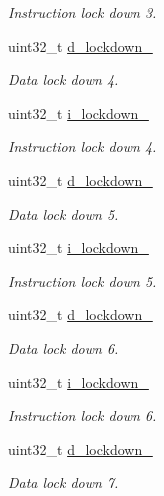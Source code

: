\begin{DoxyCompactItemize}
\begin{DoxyCompactList}\small\item\em Instruction lock down 3. \end{DoxyCompactList}\item 
uint32\+\_\+t \mbox{\hyperlink{group__L2C-310__cache_ga65d17f11698ba1fb6b608c6067e3b822}{d\+\_\+lockdown\+\_}}
\begin{DoxyCompactList}\small\item\em Data lock down 4. \end{DoxyCompactList}\item 
uint32\+\_\+t \mbox{\hyperlink{group__L2C-310__cache_ga4f80c905aa661050921790befc94b792}{i\+\_\+lockdown\+\_}}
\begin{DoxyCompactList}\small\item\em Instruction lock down 4. \end{DoxyCompactList}\item 
uint32\+\_\+t \mbox{\hyperlink{group__L2C-310__cache_gaeeb5f8fca64453b14addb33ec2a616c7}{d\+\_\+lockdown\+\_}}
\begin{DoxyCompactList}\small\item\em Data lock down 5. \end{DoxyCompactList}\item 
uint32\+\_\+t \mbox{\hyperlink{group__L2C-310__cache_gac26d73de3cfb28186d3e380d6c325cdc}{i\+\_\+lockdown\+\_}}
\begin{DoxyCompactList}\small\item\em Instruction lock down 5. \end{DoxyCompactList}\item 
uint32\+\_\+t \mbox{\hyperlink{group__L2C-310__cache_ga9a9eacfc4120a031c4382279b87cbef2}{d\+\_\+lockdown\+\_}}
\begin{DoxyCompactList}\small\item\em Data lock down 6. \end{DoxyCompactList}\item 
uint32\+\_\+t \mbox{\hyperlink{group__L2C-310__cache_gabd6ed12058feab2d04abfc185cc61ff7}{i\+\_\+lockdown\+\_}}
\begin{DoxyCompactList}\small\item\em Instruction lock down 6. \end{DoxyCompactList}\item 
uint32\+\_\+t \mbox{\hyperlink{group__L2C-310__cache_ga289351da21270036223a31d9d0004064}{d\+\_\+lockdown\+\_}}
\begin{DoxyCompactList}\small\item\em Data lock down 7. \end{DoxyCompactList}\item 

\end{DoxyCompactItemize}
